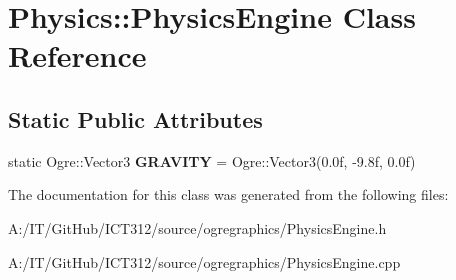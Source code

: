 \hypertarget{class_physics_1_1_physics_engine}{\section{Physics\-:\-:Physics\-Engine Class Reference}
\label{class_physics_1_1_physics_engine}
}
\subsection*{Static Public Attributes}
\begin{DoxyCompactItemize}
\item 
\hypertarget{class_physics_1_1_physics_engine_ad38542a74bd0d36b7fba2ca4ca5b869a}{static Ogre\-::\-Vector3 {\bfseries G\-R\-A\-V\-I\-T\-Y} = Ogre\-::\-Vector3(0.\-0f, -\/9.\-8f, 0.\-0f)}\label{class_physics_1_1_physics_engine_ad38542a74bd0d36b7fba2ca4ca5b869a}

\end{DoxyCompactItemize}


The documentation for this class was generated from the following files\-:\begin{DoxyCompactItemize}
\item 
A\-:/\-I\-T/\-Git\-Hub/\-I\-C\-T312/source/ogregraphics/Physics\-Engine.\-h\item 
A\-:/\-I\-T/\-Git\-Hub/\-I\-C\-T312/source/ogregraphics/Physics\-Engine.\-cpp\end{DoxyCompactItemize}
